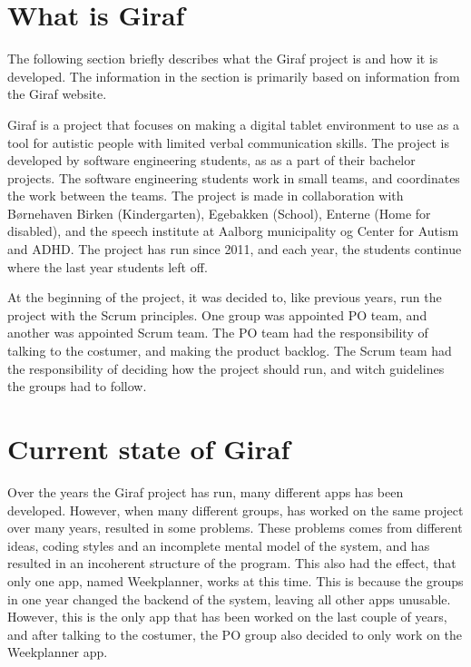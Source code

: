 \section{What is Giraf} %
\label{cha:What is Giraf}

The following section briefly describes what the Giraf project is and how it is developed. The information in the section is primarily based on information from the Giraf website\cite{GirafWebsite}. \newline 

\par \noindent
Giraf is a project that focuses on making a digital tablet environment to use as a tool for autistic people with limited verbal communication skills. The project is developed by software engineering students, as as a part of their bachelor projects.  The software engineering students work in small teams, and coordinates the work between the teams. The project is made in collaboration with Børnehaven Birken (Kindergarten)\cite{bhBirken}, Egebakken (School)\cite{egebakken}, Enterne (Home for disabled)\cite{enterne}, and the speech institute at Aalborg municipality og Center for Autism and ADHD\cite{center_for_autism}. The project has run since 2011, and each year, the students continue where the last year students left off. \newline 

\par \noindent
At the beginning of the project, it was decided to, like previous years, run the project with the Scrum principles. One group was appointed \gls{PO} team, and another was appointed Scrum team. The \gls{PO} team had the responsibility of talking to the costumer, and making the product backlog. The Scrum team had the responsibility of deciding how the project should run, and witch guidelines the groups had to follow. 

\section{Current state of Giraf}

Over the years the Giraf project has run, many different apps has been developed. However, when many different groups, has worked on the same project over many years,  resulted in some problems. \newline
These problems comes from different ideas, coding styles and an incomplete mental model of the system, and has resulted in an incoherent structure of the program.  \newline
This also had the effect, that only one app, named Weekplanner, works at this time. This is because the groups in one year changed the backend of the system, leaving all other apps unusable. \newline
However, this is the only app that has been worked on the last couple of years, and after talking to the costumer, the \gls{PO} group also decided to only work on the Weekplanner app.  \newline 

